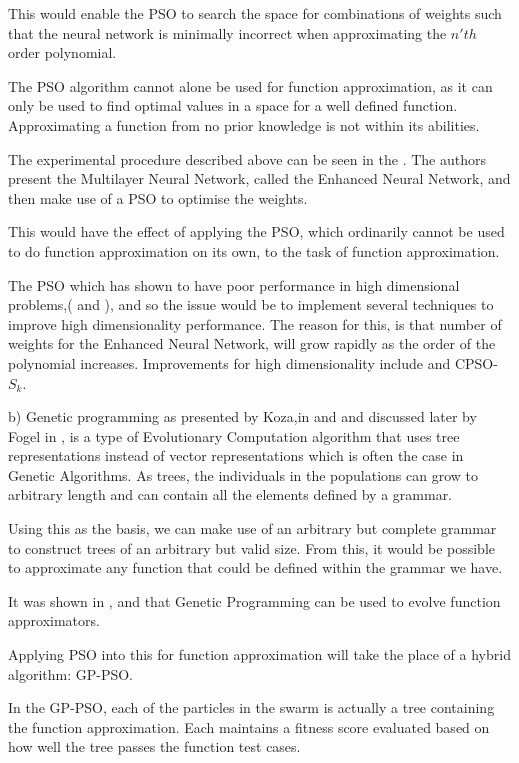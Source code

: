 \documentclass[12pt]{article}
\begin{document}
This would enable the PSO to search the space for combinations of weights such that the neural network is minimally incorrect when approximating the $n'th$ order polynomial.

The PSO algorithm cannot alone be used for function approximation, as it can only be used to find optimal values in a space for a well defined function. Approximating a function from no prior knowledge is not within its abilities.

The experimental procedure described above can be seen in the \cite{depolynomiaal}. The authors present the Multilayer Neural Network, called the Enhanced Neural Network, and then make use of a PSO to optimise the weights. 

This would have the effect of applying the PSO, which ordinarily cannot be used to do function approximation on its own, to the task of function approximation.

The PSO which has shown to have poor performance in high dimensional problems,(\cite{jamian_abdullah_mokhlis_mustafa_bakar_2014} and \cite{monson05}), and so the issue would be to implement several techniques to improve high dimensionality performance. The reason for this, is that number of weights for the Enhanced Neural Network, will grow rapidly as the order of the polynomial increases. Improvements for high dimensionality include \cite{clerc11} and CPSO-$S_k$.

b) Genetic programming as presented by Koza,in \cite{koza_1998} and \cite{Koza:1989:HGA:1623755.1623877} and discussed later by Fogel in \cite{fogel}, is a type of Evolutionary Computation algorithm that uses tree representations instead of vector representations which is often the case in Genetic Algorithms. As trees, the individuals in the populations can grow to arbitrary length and can contain all the elements defined by a grammar. 

Using this as the basis, we can make use of an arbitrary but complete grammar to construct trees of an arbitrary but valid size. From this, it would be possible to approximate any function that could be defined within the grammar we have.

It was shown in \cite{rodríguez-vázquez_oliver-morales_2004},\cite{Yeun2000259} and \cite{kirshenbaum_suermondt_2004} that Genetic Programming can be used to evolve function approximators.

Applying PSO into this for function approximation will take the place of a hybrid algorithm: GP-PSO.

In the GP-PSO, each of the particles in the swarm is actually a tree containing the function approximation. Each maintains a fitness score evaluated based on how well the tree passes the function test cases. 
\end{document}

